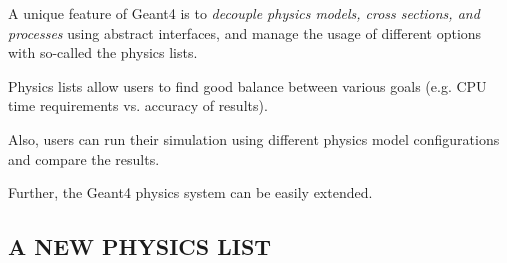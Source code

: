 \documentclass[20pt]{article}
\newenvironment{textbox}
{\begin{lrbox}{\dummybox}\begin{minipage}{0.9\columnwidth}}
{\end{minipage}\end{lrbox}\raisebox{-\depth}{\psshadowbox[framesep=1em,framearc=.1,shadow=true]{\usebox{\dummybox}}}\vspace{0.005\textheight}}
\begin{document}
\begin{center}
\begin{multicols}{3}
\begin{textbox}
A unique feature of {\sf Geant4} is to  
\emph{decouple physics models, cross sections, and processes}
using abstract interfaces, and manage the usage of different options with so-called the physics lists.


\begin{itemize}
{\color{udsect}
\item Physics lists allow users to find good balance between various goals (e.g. CPU
time requirements vs. accuracy of results).
}
\item Also, users can run their simulation using different physics model
configurations and compare the results.

\item Further, the {\sf Geant4} physics system can be easily extended.
\end{itemize}

\end{textbox}


\vspace{0.4cm}
\begin{textbox}

\section*{{\Huge {\sf  A NEW PHYSICS LIST}}}


\end{textbox}
\end{multicols}
\end{center}
\end{document}
